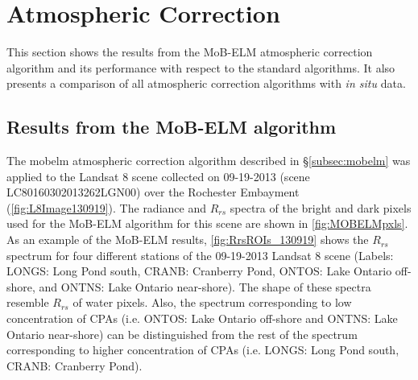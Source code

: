 \section{Atmospheric Correction}
\label{sec:AC_Results}
This section shows the results from the MoB-ELM atmospheric correction algorithm and its performance with respect to the standard algorithms. It also presents a comparison of all atmospheric correction algorithms with {\it in situ} data.

\subsection{Results from the MoB-ELM algorithm}

The \gls{mobelm} atmospheric correction algorithm described in \S\ref{subsec:mobelm} was applied to the Landsat 8 scene collected on 09-19-2013 (scene LC80160302013262LGN00) over the Rochester Embayment (\autoref{fig:L8Image130919}). The radiance and $R_{rs}$ spectra of the bright and dark pixels used for the MoB-ELM algorithm for this scene are shown in \autoref{fig:MOBELMpxls}. As an example of the MoB-ELM results, \autoref{fig:RrsROIs_130919} shows the $R_{rs}$ spectrum for four different stations of the 09-19-2013 Landsat 8 scene  (Labels: LONGS: Long Pond south, CRANB: Cranberry Pond, ONTOS: Lake Ontario off-shore, and ONTNS: Lake Ontario near-shore). The shape of these spectra resemble $R_{rs}$ of water pixels. Also, the spectrum corresponding to low concentration of CPAs (i.e. ONTOS: Lake Ontario off-shore and ONTNS: Lake Ontario near-shore) can be distinguished from the rest of the spectrum corresponding to higher concentration of CPAs (i.e. LONGS: Long Pond south, CRANB: Cranberry Pond).

